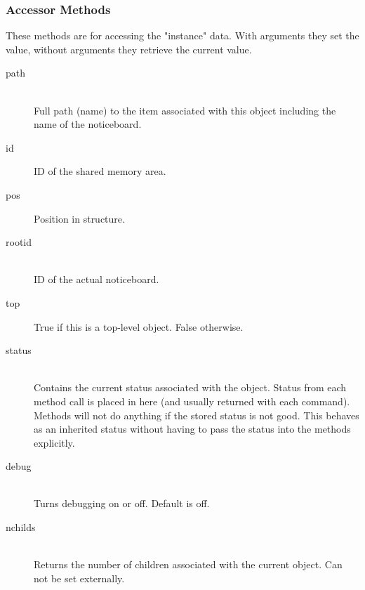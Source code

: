 \documentclass[twoside,11pt]{article}
\renewcommand{\_}{\texttt{\symbol{95}}}
\begin{document}
\subsubsection*{Accessor Methods}%

These methods are for accessing the "instance" data.
With arguments they set the value, without arguments they
retrieve the current value.

\begin{description}

\item[path]%
%
\hfill\\
Full path (name) to the item associated with this object
including the name of the noticeboard.

\item[id]%
%

ID of the shared memory area.

\item[pos]%
%

Position in structure.

\item[rootid]%
%
\hfill\\
ID of the actual noticeboard.

\item[top]%
%

True if this is a top-level object. False otherwise.

\item[status]%
%
\hfill\\
Contains the current status associated with the object. Status from
each method call is placed in here (and usually returned with each
command). Methods will not do anything if the stored status is not
good. This behaves as an inherited status without having to pass
the status into the methods explicitly.

\item[debug]%
%
\hfill\\
Turns debugging on or off. Default is off.

\item[nchilds]%
%
\hfill\\
Returns the number of children associated with the current object.
Can not be set externally.

\end{description}
\end{document}

